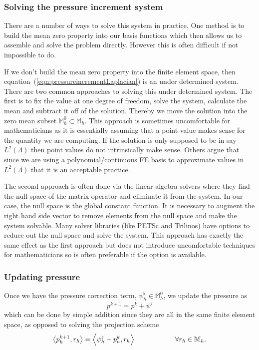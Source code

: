 \documentclass[letterpaper]{erdc}
\begin{document}
\subsubsection{Solving the pressure increment system}
\label{sec:NeumannLaplaceEquationSolvers}
There are a number of ways to solve this system in practice.  One method is to
build the mean zero property into our basis functions which then allows us to
assemble and solve the problem directly.  However this is often difficult if
not impossible to do.

If we don't build the mean zero property into the finite element space, then
equation~(\ref{eqn:pressureincrementLaplacian}) is an under determined system.
There are two common approaches to solving this under determined system.  The
first is to fix the value at one degree of freedom, solve the system, calculate
the mean and subtract it off of the solution.  Thereby we move the solution
into the zero mean subset $\mathbb{M}_h^0\subset \mathbb{M}_h$.  This approach
is sometimes uncomfortable for mathematicians as it is essentially assuming
that a point value makes sense for the quantity we are computing.  If the
solution is only supposed to be in say $L^2(\Lambda)$ then point values do not
intrinsically make sense.  Others argue that since we are using a
polynomial/continuous FE basis to approximate values in $L^2(\Lambda)$ that it
is an acceptable practice.

The second approach is often done via the linear algebra solvers where they
find the null space of the matrix operator and eliminate it from the system.
In our case, the null space is the global constant function.  It is necessary
to augment the right hand side vector to remove elements from the null space
and make the system solvable.  Many solver libraries (like PETSc and Trilinos)
have options to reduce out the null space and solve the system.  This approach
has exactly the same effect as the first approach but does not introduce
uncomfortable techniques for mathematicians so is often preferable if the
option is available.


\subsubsection{Updating pressure}

Once we have the pressure correction term, $\psi^{\flat}_h\in \mathbb{M}_h^0$,
we update the pressure as
\begin{equation}\label{eqn:rotationalpressureupdate}
  p^{k+1} = p^{k} + \psi^{\flat}
\end{equation}
which can be done by simple addition since they are all in the same finite
element space, as opposed to solving the projection scheme
\begin{equation}
  \left\langle p_h^{k+1}, r_h \right\rangle = \left\langle \psi_h^{\flat} + p_h^{k}, r_h \right\rangle \hspace{2cm} \forall r_h\in \mathbb{M}_h.
\end{equation}
\end{document}
